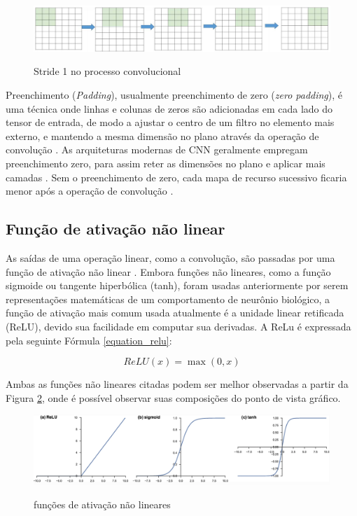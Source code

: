 \documentclass[
	12pt,				%
	oneside,			%
	a4paper,			%
	english,			%
	brazil				%
	]{abntex2ppgsi}
\begin{document}
\begin{figure}[H]
    \centering
    \caption{Stride 1 no processo convolucional}
    \includegraphics[scale=.40]{imagens/conceitos_basicos/convolution_stride_cnn.png}
    \label{fig:convolution_stride_cnn}
\end{figure}

Preenchimento (\textit{Padding}), usualmente preenchimento de zero (\textit{zero padding}), é uma técnica onde linhas e colunas de zeros são adicionadas em cada lado do tensor de entrada, de modo a ajustar o centro de um filtro no elemento mais externo, e mantendo a mesma dimensão no plano através da operação de convolução \cite{yamashita2018convolutional}. As arquiteturas modernas de CNN geralmente empregam preenchimento zero, para assim reter as dimensões no plano e aplicar mais camadas \cite{yamashita2018convolutional}. Sem o preenchimento de zero, cada mapa de recurso sucessivo ficaria menor após a operação de convolução \cite{yamashita2018convolutional}.

\subsection{Função de ativação não linear}
As saídas de uma operação linear, como a convolução, são passadas por uma função de ativação não linear \cite{albawi2017understanding}. Embora funções não lineares, como a função sigmoide ou tangente hiperbólica (tanh), foram usadas anteriormente por serem representações matemáticas de um comportamento de neurônio biológico, a função de ativação mais comum usada atualmente é a unidade linear retificada (ReLU), devido sua facilidade em computar sua derivadas. A ReLu é expressada pela seguinte Fórmula \ref{equation_relu}:

\begin{equation}
  ReLU(x)=\max(0, x)
  \label{equation_relu}
\end{equation}

Ambas as funções não lineares citadas podem ser melhor observadas a partir da Figura \ref{fig:nonlinearity_functions}, onde é possível observar suas composições do ponto de vista gráfico.

\begin{figure}[H]
    \centering
    \caption{funções de ativação não lineares}
    \includegraphics[scale=.35]{imagens/conceitos_basicos/nonlinearity_functions.png}
    \label{fig:nonlinearity_functions}
\end{figure}
\end{document}
